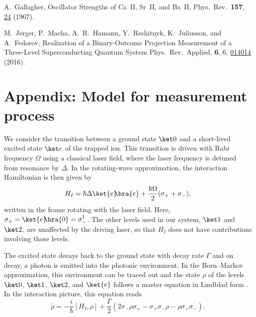 \documentclass[12pt,
onecolumn,
superscriptaddress,
floatfix,
]{revtex4-2}
\renewcommand{\doi}[2]{{\href{http://doi.org/#1}{#2}}}
\newcommand{\ketbra}[2]{{\ket{#1}\!\!\bra{#2}}}
\newcommand{\proj}[1]{{\ketbra{#1}{#1}}}
\begin{document}
\begin{thebibliography}{99}
%
A.\ Gallagher,
Oscillator Strengths of Ca~II, Sr~II, and Ba~II,
Phys.\ Rev.\ \textbf{157}, \doi{10.1103/PhysRev.157.24}{24} (1967).

%
M.\ Jerger, P.\ Macha, A.\ R.\ Hamann, Y.\ Reshitnyk, K.\ Juliusson, and A.\ Fedorov,
Realization of a Binary-Outcome Projection Measurement of a Three-Level Superconducting Quantum System
Phys.\ Rev.\ Applied, \textbf{6}, 6, \doi{10.1103/PhysRevApplied.6.014014}{014014} (2016).

\end{thebibliography}

\appendix
\section{Appendix: Model for measurement process}
We consider the transition between a ground state $\ket0$ and a short-lived 
 excited state $\ket e$ of the trapped ion.
This transition is driven with Rabi frequency $\Omega$
 using a classical laser field, where the laser frequency is detuned from resonance by $\Delta$.
In the rotating-wave approximation, the interaction Hamiltonian is then given 
 by \cite{Carmichael93}
%
\begin{equation}
 H_I= \hbar \Delta \proj{e}+ \frac{\hbar\Omega}2 (\sigma_+ + \sigma_-),
\end{equation}
%
 written in the frame rotating with the laser field.
Here, $\sigma_+= \ketbra{e}0= \sigma_-^\dag$.
The other levels used in our system, $\ket1$ and $\ket2$, are unaffected by the 
 driving laser, so that $H_I$ does not have contributions involving those 
 levels.

The excited state decays back to the ground state with decay rate $\Gamma$ and 
 on decay, a photon is emitted into the photonic environment.
In the Born--Markov approximation, this environment can be traced out and the 
 state $\rho$ of the levels $\ket0$, $\ket1$, $\ket2$, and $\ket{e}$ follows a 
 master equation in Lindblad form \cite{Carmichael93}.
In the interaction picture, this equation reads
%
\begin{equation}\label{eq:master}
 \dot{\rho}= -\frac{i}{\hbar}[H_I,\rho]+
 \frac\Gamma2(2\sigma_-\rho \sigma_+-\sigma_+ \sigma_-\rho-\rho \sigma_+ 
\sigma_-).
\end{equation}
\end{document}
